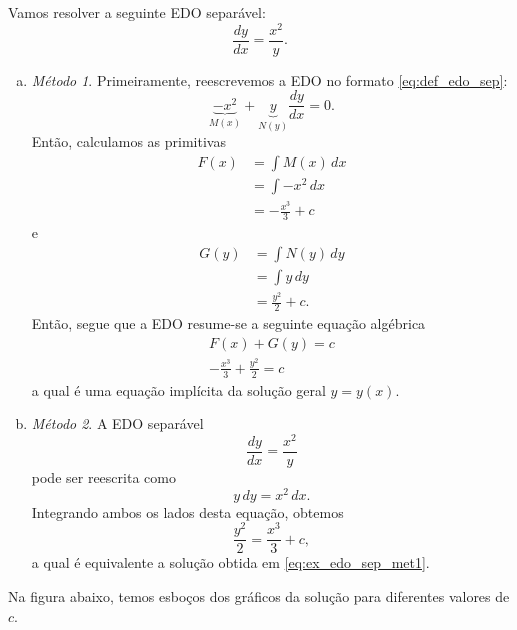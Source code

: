 \begin{ex}\label{ex:edo_sep_metsol}
  Vamos resolver a seguinte EDO separável:
  \begin{equation}
    \frac{dy}{dx} = \frac{x^2}{y}.
  \end{equation}
  \begin{enumerate}[a)]
  \item \emph{Método 1}.
  Primeiramente, reescrevemos a EDO no formato \eqref{eq:def_edo_sep}:
  \begin{equation}
    \underbrace{-x^2}_{M(x)} + \underbrace{y}_{N(y)}\frac{dy}{dx} = 0.
  \end{equation}
  Então, calculamos as primitivas
  \begin{align}
    F(x) &= \int M(x)\,dx\\
         &= \int -x^2\,dx \\
         &= -\frac{x^3}{3} + c
  \end{align}
  e
  \begin{align}
    G(y) &= \int N(y)\,dy \\
         &= \int y\,dy \\
         &= \frac{y^2}{2} + c.
  \end{align}
  Então, segue que a EDO resume-se a seguinte equação algébrica
  \begin{gather}
    F(x) + G(y) = c \\
    -\frac{x^3}{3} + \frac{y^2}{2} = c \label{eq:ex_edo_sep_met1}
  \end{gather}
  a qual é uma equação implícita da solução geral $y = y(x)$. 
  
\item \emph{Método 2}.
  A EDO separável
  \begin{equation}
    \frac{dy}{dx} = \frac{x^2}{y}
  \end{equation}
  pode ser reescrita como
  \begin{equation}
    y\,dy = x^2\,dx.
  \end{equation}
  Integrando ambos os lados desta equação, obtemos
  \begin{equation}
    \frac{y^2}{2} = \frac{x^3}{3} + c,
  \end{equation}
  a qual é equivalente a solução obtida em \eqref{eq:ex_edo_sep_met1}.
\end{enumerate}

Na figura abaixo, temos esboços dos gráficos da solução para diferentes valores de $c$.


\end{ex}
